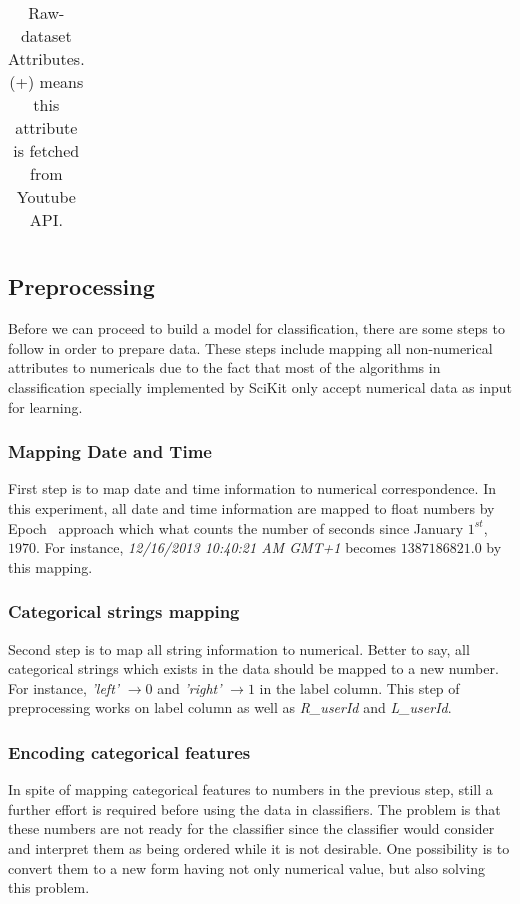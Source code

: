 \begin{table}[p]
\begin{center}
\begin{tabular}{||l|l||}
	\end{tabular}
\end{center}
	\caption{Raw-dataset Attributes. (+) means this attribute is fetched from
	Youtube API.
	\label{ds3:table:attributes}}
\end{table}






\subsection{Preprocessing}

Before we can proceed to build a model for classification, there are some steps
to follow in order to prepare data. These steps include mapping all
non-numerical attributes to numericals due to the fact that most of the
algorithms in classification specially implemented by SciKit only accept
numerical data as input for learning.

\subsubsection{Mapping Date and Time}

First step is to map date and time information to numerical correspondence. In
this experiment, all date and time information are mapped to float numbers by
Epoch~\cite{ritchie1971unix} approach which what counts the number of seconds
since January $1^{st}$, $1970$. For instance, {\it 12/16/2013 10:40:21 AM GMT+1} becomes
$1387186821.0$ by this mapping.

\subsubsection{Categorical strings mapping}

Second step is to map all string information to numerical. Better to say, all
categorical strings which exists in the data should be mapped to a new number.
For instance, {\it 'left'} $\to 0$ and {\it 'right'} $\to 1$ in the label
column. This step of preprocessing works on label column as well as
{\it R\_userId} and {\it L\_userId}.

\subsubsection{Encoding categorical features} 

In spite of mapping categorical features to numbers in the previous step, still
a further effort is required before using the data in classifiers. The problem
is that these numbers are not ready for the classifier since the classifier
would consider and interpret them as being ordered while it is not desirable.
One possibility is to convert them to a new form having not only numerical
value, but also solving this problem. 

